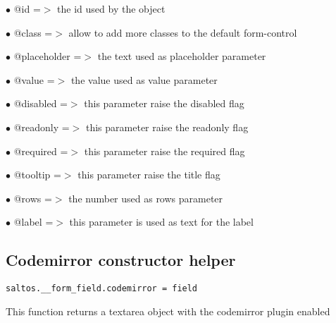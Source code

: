 \documentclass[a4paper]{book}
\begin{document}
\begin{compactitem}
\item[\color{myblue}$\bullet$] @id          =$>$ the id used by the object
\item[\color{myblue}$\bullet$] @class       =$>$ allow to add more classes to the default form-control
\item[\color{myblue}$\bullet$] @placeholder =$>$ the text used as placeholder parameter
\item[\color{myblue}$\bullet$] @value       =$>$ the value used as value parameter
\item[\color{myblue}$\bullet$] @disabled    =$>$ this parameter raise the disabled flag
\item[\color{myblue}$\bullet$] @readonly    =$>$ this parameter raise the readonly flag
\item[\color{myblue}$\bullet$] @required    =$>$ this parameter raise the required flag
\item[\color{myblue}$\bullet$] @tooltip     =$>$ this parameter raise the title flag
\item[\color{myblue}$\bullet$] @rows        =$>$ the number used as rows parameter
\item[\color{myblue}$\bullet$] @label       =$>$ this parameter is used as text for the label
\end{compactitem}

\hypertarget{toc384}{}
\subsection{Codemirror constructor helper}

\begin{lstlisting}
saltos.__form_field.codemirror = field
\end{lstlisting}

This function returns a textarea object with the codemirror plugin enabled
\end{document}
